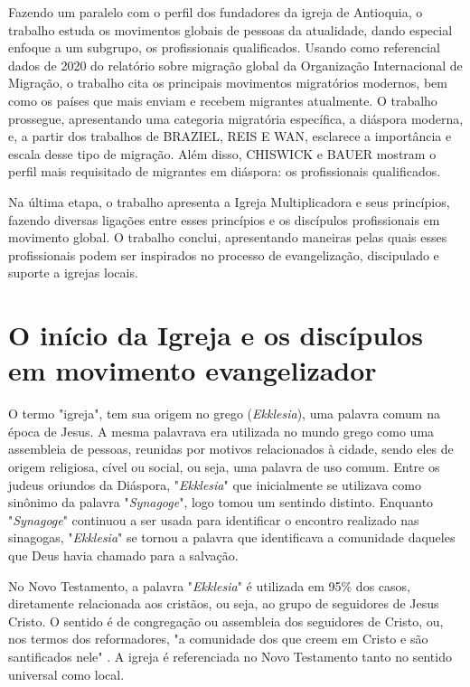 \documentclass[12pt,openright,oneside,a4paper]{abntex2}
\begin{document}
Fazendo um paralelo com o perfil dos fundadores da igreja de Antioquia, o trabalho estuda os movimentos globais de pessoas da atualidade, dando especial enfoque a um subgrupo, os profissionais qualificados. Usando como referencial dados de 2020 do relatório sobre migração global da Organização Internacional de Migração, o trabalho cita os principais movimentos migratórios modernos, bem como os países que mais enviam e recebem migrantes atualmente. O trabalho prossegue, apresentando uma categoria migratória específica, a diáspora moderna, e, a partir dos trabalhos de BRAZIEL, REIS E WAN, esclarece a importância e escala desse tipo de migração. Além disso, CHISWICK e BAUER mostram o perfil mais requisitado de migrantes em diáspora: os profissionais qualificados. 

Na última etapa, o trabalho apresenta a Igreja Multiplicadora e seus princípios, fazendo diversas ligações entre esses princípios e os discípulos profissionais em movimento global. O trabalho conclui, apresentando maneiras pelas quais esses profissionais podem ser inspirados no processo de evangelização, discipulado e suporte a igrejas locais.


\chapter{O início da Igreja e os discípulos em movimento evangelizador}

O termo "igreja", tem sua origem no grego (\textit{Ekklesia}), uma palavra comum na época de Jesus. A mesma palavrava era utilizada no mundo grego como uma assembleia de pessoas, reunidas por motivos relacionados à cidade, sendo eles de origem religiosa, cível ou social, ou seja, uma palavra de uso comum\cite[p. 317]{zac}. Entre os judeus oriundos da Diáspora, "\textit{Ekklesia}" que inicialmente se utilizava como sinônimo da palavra "\textit{Synagoge}", logo tomou um sentindo distinto. Enquanto "\textit{Synagoge}" continuou a ser usada para identificar o encontro realizado nas sinagogas, "\textit{Ekklesia}" se tornou a palavra que identificava a comunidade daqueles que Deus havia chamado para a salvação\cite[p. 485]{bavinck}. 

No Novo Testamento, a palavra "\textit{Ekklesia}" é utilizada em 95\% dos casos, diretamente relacionada aos cristãos, ou seja, ao grupo de seguidores de Jesus Cristo. O sentido é de congregação ou assembleia dos seguidores de Cristo, ou, nos termos dos reformadores, "a comunidade dos que creem em Cristo e são santificados nele" \cite[p. 318]{zac}. A igreja é referenciada no Novo Testamento tanto no sentido universal como local\cite[p. 318]{zac}.
\end{document}
